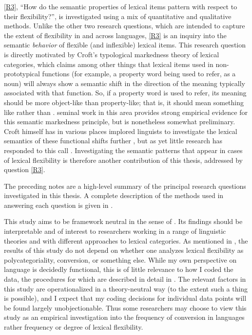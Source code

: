 \ref{R3}, \enquote{How do the semantic properties of lexical items pattern with respect to their flexibility?}, is investigated using a mix of quantitative and qualitative methods. Unlike the other two research questions, which are intended to capture the extent of flexibility in and across languages, \ref{R3} is an inquiry into the semantic \emph{behavior} of flexible (and inflexible) lexical items. This research question is directly motivated by Croft's \parencites*{Croft1991}{Croft2000}{Croft2001b}{Croftfc} typological markedness theory of lexical categories, which claims among other things that lexical items used in non-prototypical functions (for example, a property word being used to refer, as a noun) will always show a semantic shift in the direction of the meaning typically associated with that function. So, if a property word is used to refer, its meaning should be more object-like than property-like; that is, it should mean something like  rather than .  seminal work in this area provides strong empirical evidence for this semantic markedness principle, but is nonetheless somewhat preliminary. Croft himself has in various places implored linguists to investigate the lexical semantics of these functional shifts further \parencites[440]{Croft2005}[70]{CroftLier2012}, but as yet little research has responded to this call . Investigating the semantic patterns that appear in cases of lexical flexibility is therefore another contribution of this thesis, addressed by question \ref{R3}.

The preceding notes are a high-level summary of the principal research questions investigated in this thesis. A complete description of the methods used in answering each question is given in .

This study aims to be framework neutral in the sense of \textcite{Haspelmath2010b}. Its findings should be interpretable and of interest to researchers working in a range of linguistic theories and with different approaches to lexical categories. As mentioned in , the results of this study do not depend on whether one analyzes lexical flexibility as polycategoriality, conversion, or something else. While my own perspective on language is decidedly functional, this is of little relevance to how I coded the data, the procedures for which are described in detail in . The relevant factors in this study are operationalized in a theory-neutral way (to the extent such a thing is possible), and I expect that my coding decisions for individual data points will be found largely unobjectionable. Thus some researchers may choose to view this study as an empirical investigation into the frequency of conversion in languages rather frequency or degree of lexical flexibility.

